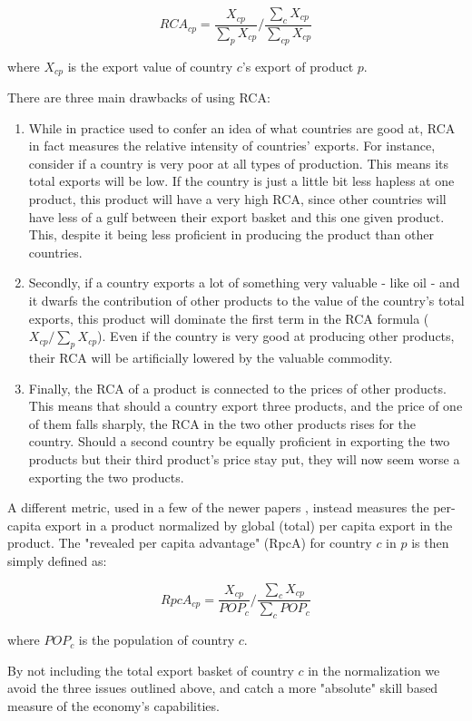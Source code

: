 \documentclass[11pt]{article}
\begin{document}
\begin{appendices}
\[
	RCA_{cp} = \frac{X_{cp}}{\sum_p X_{cp}} \bigg / \frac{\sum_c X_{cp}}{\sum_{cp} X_{cp}}
\]

where $X_{cp}$ is the export value of country $c$'s export of product $p$.

There are three main drawbacks of using RCA:

\begin{enumerate}
\item While in practice used to confer an idea of what countries are good at, RCA in fact measures the relative intensity of countries' exports. For instance, consider if a country is very poor at all types of production. This means its total exports will be low. If the country is just a little bit less hapless at one product, this product will have a very high RCA, since other countries will have less of a gulf between their export basket and this one given product. This, despite it being less proficient in producing the product than other countries.
\item Secondly, if a country exports a lot of something very valuable - like oil - and it dwarfs the contribution of other products to the value of the country's total exports, this product will dominate the first term in the RCA formula ($X_{cp} / \sum_p X_{cp}$). Even if the country is very good at producing other products, their RCA will be artificially lowered by the valuable commodity.
\item Finally, the RCA of a product is connected to the prices of other products. This means that should a country export three products, and the price of one of them falls sharply, the RCA in the two other products rises for the country. Should a second country be equally proficient in exporting the two products but their third product's price stay put, they will now seem worse a exporting the two products.
\end{enumerate}

A different metric, used in a few of the newer papers \citep{hausmann_implied_2019}, instead measures the per-capita export in a product normalized by global (total) per capita export in the product. The "revealed per capita advantage" (RpcA) for country $c$ in $p$ is then simply defined as:

\[
	RpcA_{cp} = \frac{X_{cp}}{POP_{c}} \bigg / \frac{\sum_c X_{cp}}{\sum_c POP_c}
\]

where $POP_c$ is the population of country $c$.

By not including the total export basket of country $c$ in the normalization we avoid the three issues outlined above, and catch a more "absolute" skill based measure of the economy's capabilities. 


\end{appendices}
\end{document}
